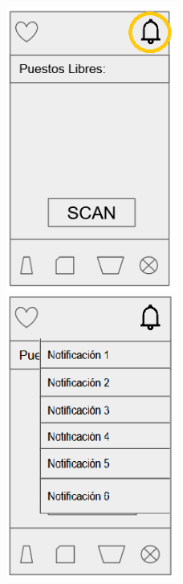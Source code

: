 \documentclass[12pt]{article}
\begin{document}
\begin{figure}[!h]
\centering
{}
	\includegraphics[width=0.5\textwidth]{notificaciones1.png} 
\endminipage
{}
	\includegraphics[width=0.5\textwidth]{notificaciones2.png} 
\endminipage
\end{figure}
\end{document}
